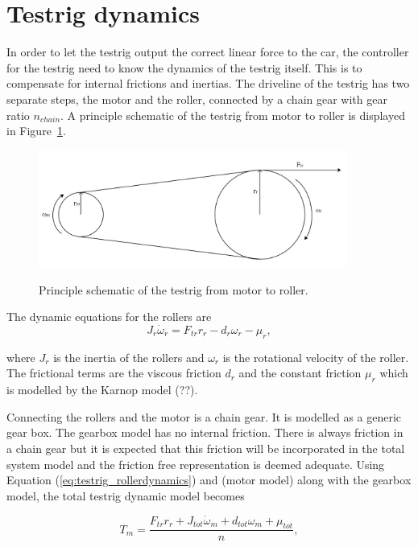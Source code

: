 \section{Testrig dynamics}
In order to let the testrig output the correct linear force to the car, the
controller for the testrig need to know the dynamics of the testrig itself. This
is to compensate for internal frictions and inertias. The driveline of the
testrig has two separate steps, the motor and the roller, connected by a chain
gear with gear ratio $n_{chain}$. A principle schematic of the testrig from
motor to roller is displayed in Figure~\ref{fig:testrig_testrigdynamics}.
\begin{figure}[H]
    \centering\label{fig:testrig_testrigdynamics}
    \includegraphics[width=0.9\textwidth]{./img/testrig_rollerschematic.png}
    \caption{Principle schematic of the testrig from motor to roller.}
\end{figure}
The dynamic equations for the rollers are
\begin{equation} \label{eq:testrig_rollerdynamics}
    J_r \dot{\omega}_r = F_{tr}r_r - d_r \omega_r - \mu_r,
\end{equation}

where $J_r$ is the inertia of the rollers and $\omega_r$ is the rotational velocity
of the roller. The frictional terms are the viscous friction $d_r$ and the
constant friction $\mu_r$ which is modelled by the Karnop model (??).

Connecting the rollers and the motor is a chain gear. It is modelled as a
generic gear box. The gearbox model has no internal friction. There is always friction in a
chain gear but it is expected that this friction will be incorporated in the
total system model and the friction free representation is deemed adequate.
Using Equation (\ref{eq:testrig_rollerdynamics}) and (motor model) along with
the gearbox model, the total testrig dynamic model becomes

\begin{equation} \label{eq:testrig_totaldynamics} 
    T_m = \frac{F_{tr} r_r + J_{tot} \dot{\omega}_m + d_{tot} \omega_m + \mu_{tot}}{n},
\end{equation}

